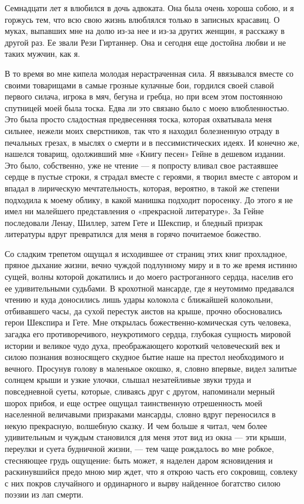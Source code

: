 Семнадцати  лет я  влюбился в  дочь  адвоката. Она  была очень  хороша
собою, и я горжусь тем, что всю свою жизнь влюблялся только в записных
красавиц.  О муках,  выпавших мне  на долю  из-за нее  и из-за  других
женщин,  я расскажу  в  другой раз.  Ее звали  Рези  Гиртаннер. Она  и
сегодня еще достойна любви и не таких мужчин, как я.

В то  время во  мне кипела молодая  нерастраченная сила.  Я ввязывался
вместе со  своими товарищами  в самые  грозные кулачные  бои, гордился
своей славой  первого силача, игрока  в мяч,  бегуна и гребца,  но при
всем этом  постоянною спутницей моей  была тоска. Едва ли  это связано
было  с моею  влюбленностью. Это  была просто  сладостная предвесенняя
тоска, которая  охватывала меня сильнее, нежели  моих сверстников, так
что я находил болезненную отраду в печальных грезах, в мыслях о смерти
и в пессимистических идеях. И  конечно же, нашелся товарищ, одолживший
мне «Книгу песен»  Гейне в дешевом издании. Это  было, собственно, уже
не  чтение ---  я  попросту  вливал свое  растаявшее  сердце в  пустые
строки, я страдал вместе с героями, я творил вместе с автором и впадал
в  лирическую мечтательность,  которая, вероятно,  в такой  же степени
подходила к моему облику, в какой манишка подходит поросенку. До этого
я не  имел ни  малейшего представления  о «прекрасной  литературе». За
Гейне  последовали Ленау,  Шиллер,  затем Гете  и  Шекспир, и  бледный
призрак  литературы вдруг  превратился  для меня  в горячо  почитаемое
божество.

Со  сладким  трепетом  ощущал  я   исходившее  от  страниц  этих  книг
прохладное,  пряное  дыхание  жизни,   вечно  чуждой  подлунному  миру
и  в  то  же  время  истинно сущей,  волны  которой  докатились  и  до
моего  растроганного сердца,  населив его  ее удивительными  судьбами.
В  крохотной  мансарде,  где  я неутомимо  предавался  чтению  и  куда
доносились  лишь удары  колокола с  ближайшей колокольни,  отбивавшего
часы,  да   сухой  перестук  аистов  на   крыше,  прочно  обосновались
герои  Шекспира  и  Гете. Мне  открылась  божественно-комическая  суть
человека, загадка  его противоречивого, неукротимого  сердца, глубокая
сущность мировой истории и  великое чудо духа, преображающего короткий
человеческий  век  и силою  познания  возносящего  скудное бытие  наше
на  престол  необходимого  и  вечного.  Просунув  голову  в  маленькое
окошко,  я,  словно  впервые,  видел залитые  солнцем  крыши  и  узкие
улочки, слышал незатейливые звуки труда и повседневной суеты, которые,
сливаясь друг с  другом, напоминали мерный шорох прибоя,  и еще острее
ощущал таинственную отрешенность моей населенной величавыми призраками
мансарды,  словно  вдруг  переносился в  некую  прекрасную,  волшебную
сказку.  И  чем  больше  я  читал, чем  более  удивительным  и  чуждым
становился  для  меня  этот  вид  из  окна  ---  эти  крыши,  переулки
и  суета  будничной жизни,  ---  тем  чаще  рождалось во  мне  робкое,
стесняющее грудь ощущение:  быть может, я наделен  даром ясновидения и
раскинувшийся предо  мною мир ждет,  что я открою часть  его сокровищ,
совлеку  с  них покров  случайного  и  ординарного и  вырву  найденное
богатство силою поэзии из лап смерти.

